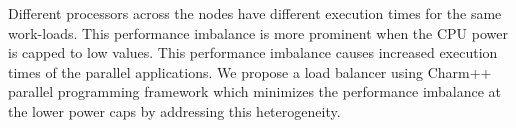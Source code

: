 Different processors across the nodes have different execution times for the
same work-loads. This performance imbalance is more prominent  when the CPU power is
capped to low values. This performance imbalance causes increased execution
times of the parallel applications.  We propose a load balancer using Charm++
parallel programming framework which minimizes the performance imbalance at the
lower power caps by addressing this heterogeneity.
